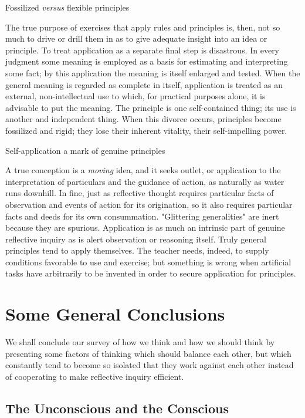 \documentclass[letterpaper]{book}
\begin{document}
Fossilized \emph{versus} flexible principles

The true purpose of exercises that apply rules and principles is, then,
not so much to drive or drill
them
in as to give adequate insight into an idea or principle. To treat
application as a separate final step is disastrous. In every judgment
some meaning is employed as a basis for estimating and interpreting some
fact; by this application the meaning is itself enlarged and tested.
When the general meaning is regarded as complete in itself, application
is treated as an external, non-intellectual use to which, for practical
purposes alone, it is advisable to put the meaning. The principle is one
self-contained thing; its use is another and independent thing. When
this divorce occurs, principles become fossilized and rigid; they lose
their inherent vitality, their self-impelling power.

Self-application a mark of genuine principles

A true conception is a \emph{moving} idea, and it seeks outlet, or
application to the interpretation of particulars and the guidance of
action, as naturally as water runs downhill. In fine, just as reflective
thought requires particular facts of observation and events of action
for its origination, so it also requires particular facts and deeds for
its own consummation. "Glittering generalities" are inert because they
are spurious. Application is as much an intrinsic part of genuine
reflective inquiry as is alert observation or reasoning itself. Truly
general principles tend to apply themselves. The teacher needs, indeed,
to supply conditions favorable to use and exercise; but something is
wrong when artificial tasks have arbitrarily to be invented in order to
secure application for
principles.

\chapter{Some General Conclusions}

We shall conclude our survey of how we think and how we should think by
presenting some factors of thinking which should balance each other, but
which constantly tend to become so isolated that they work against each
other instead of cooperating to make reflective inquiry efficient.

\section{The Unconscious and the Conscious}
\end{document}
